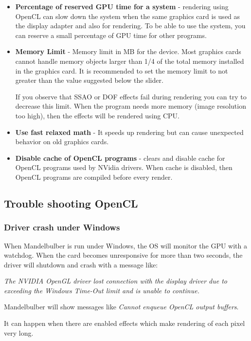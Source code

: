 \begin{itemize}
	\item \textbf{Percentage of reserved GPU time for a system} - rendering using OpenCL can slow down the system when the same graphics card is used as the display adapter and also for rendering. To be able to use the system, you can reserve a small percentage of GPU time for other programs.
	
	\item \textbf{Memory Limit} - Memory limit in MB for the device. Most graphics cards cannot handle memory objects larger than 1/4 of the total memory installed in the graphics card. It is recommended to set the memory limit to not greater than the value suggested below the slider.  
	
	If you observe that SSAO or DOF effects fail during rendering you can try to decrease this limit. When the program needs more memory (image resolution too high), then the effects will be rendered using CPU.
	
	\item \textbf{Use fast relaxed math} - It speeds up rendering but can cause unexpected behavior on old graphics cards.
	 
	\item \textbf{Disable cache of OpenCL programs} - clears and disable cache for OpenCL programs used by NVidia drivers. When cache is disabled, then OpenCL programs are compiled before every render.
\end{itemize}


\subsection{Trouble shooting OpenCL}\label{opencl-troubleshooting}

\subsubsection{Driver crash under Windows}

When Mandelbulber is run under Windows, the OS will monitor the GPU with a watchdog. When the card becomes unresponsive for more than two seconds, the driver will shutdown and crash with a message like:

\emph{The NVIDIA OpenGL driver lost connection with the display driver due to exceeding the Windows Time-Out limit and is unable to continue.}

Mandelbulber will show messages like \emph{Cannot enqueue OpenCL output buffers}.

It can happen when there are enabled effects which make rendering of each pixel very long. 

